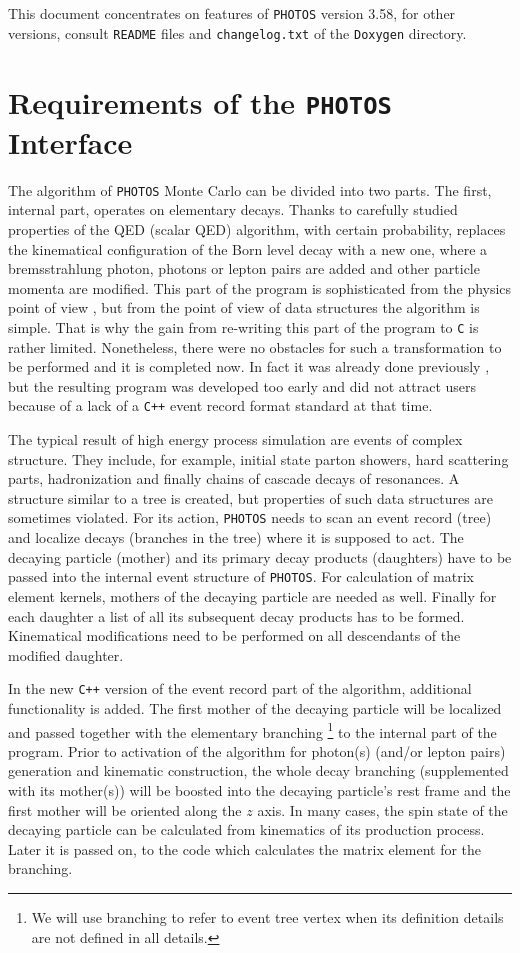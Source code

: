 \documentclass[]{Photos_interface_design}
\begin{document}
This document concentrates on features of {\tt PHOTOS} version 3.58, for 
other versions, consult {\tt README} files and {\tt changelog.txt} of the {\tt Doxygen} directory.

\section{Requirements of the {\tt PHOTOS} Interface}
\label{sec:requrements}
The algorithm of {\tt PHOTOS} Monte Carlo can be divided into two parts.
The first, internal part, operates on elementary decays. Thanks to carefully 
studied properties of the 
QED (scalar QED) algorithm, with certain probability, 
replaces the kinematical configuration of the Born level decay with a new one, 
where a bremsstrahlung photon, photons or lepton pairs
are added and other particle momenta are modified. This part of the program is sophisticated from the physics 
point of view \cite{Golonka:2006tw,Nanava:2006vv},
but from the point of view of data structures the algorithm is simple.
That is why the gain from re-writing this part of the program to {\tt C} is rather
limited. Nonetheless, there were no obstacles for such a transformation to be
performed and it is completed now. In fact it was already done
previously \cite{photosplus}, but the resulting program was developed too early 
and did not attract users because of a lack of a {\tt C++} event record format standard at that time.

The typical result of high energy process simulation are events of complex structure.
They include, for example, initial state parton showers, hard scattering parts,
hadronization and finally chains of cascade decays of resonances. 
A structure similar to a tree is created, but properties of such data structures
are sometimes violated.
For its action, {\tt PHOTOS} needs to scan an event record (tree) 
and localize decays (branches in the tree) where
it is supposed to act. The decaying particle (mother) and its primary decay products
(daughters) have to be passed into the internal event structure of {\tt PHOTOS}.
For calculation of matrix element kernels, mothers of the decaying particle are needed as well. 
Finally for each daughter a list of all its subsequent decay products has to be 
formed. Kinematical modifications need to be performed on all descendants of the modified daughter.

In the new {\tt C++} version of the event record part of the algorithm, additional functionality
is added.
The first mother of the decaying particle will be localized and passed together with  
the elementary branching%
\footnote{We will use branching to refer to event tree vertex when its definition details are not defined in all details.   }
 to the internal part of the program. 
Prior to activation of the algorithm for  photon(s) (and/or lepton pairs) generation and kinematic construction,
 the whole decay branching 
(supplemented with its mother(s))
will be boosted into the decaying particle's rest frame and the first mother
will be oriented along the $z$ axis. 
In many cases, the spin state of the decaying particle  can be calculated from kinematics of its production process.
Later it is passed on, to the code which calculates the matrix element for the branching.
\end{document}
